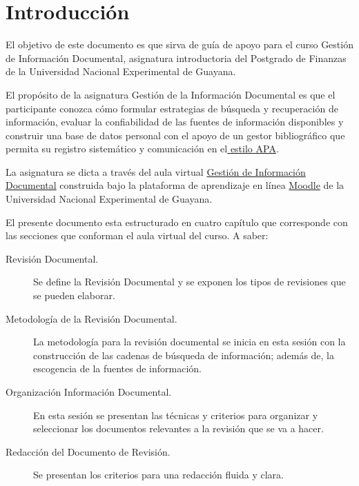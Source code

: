 \setchapterpreamble[u]{\margintoc}

\chapter*{Introducci\'on}
 


El objetivo de este  documento es que sirva de gu\'ia de apoyo para el  curso Gestión de Información Documental, asignatura introductoria  del Postgrado de Finanzas de la Universidad Nacional Experimental de Guayana. 

El propósito de la asignatura Gesti\'on de la Informaci\'on Documental es que el participante conozca cómo  formular estrategias de búsqueda y recuperación de información, evaluar la confiabilidad de las fuentes de información disponibles y construir una base de datos personal con el apoyo de un gestor bibliográfico que permita su registro sistemático y comunicación en el\href{https://normasapa.com/normas-apa-2019-cuestiones-mas-frecuentes/comment-page-11/}{ estilo APA}. 

La asignatura se dicta a trav\'es  del aula virtual \href{http://moodle.uneg.edu.ve/moodle/}{Gesti\'on de Informaci\'on Documental} construida bajo la plataforma de aprendizaje en l\'inea  \href{https://moodle.org/?lang=es}{Moodle} de la Universidad Nacional Experimental de Guayana.



El presente documento esta estructurado en cuatro cap\'itulo que corresponde con las secciones que conforman el aula virtual del curso. A saber:
\begin{description}
	\item [Revisi\'on Documental.] Se define la Revisi\'on Documental y se exponen los tipos de revisiones que se pueden elaborar.

	\item [Metodolog\'ia de la Revisi\'on Documental.] La metodolog\'ia para la revisi\'on documental se inicia en esta sesi\'on con la construcci\'on de las cadenas de b\'usqueda de informaci\'on; adem\'as de, la escogencia de la fuentes de informaci\'on.

	\item [Organizaci\'on Informaci\'on Documental.] En esta sesi\'on se presentan las t\'ecnicas y criterios para organizar y seleccionar los documentos relevantes a la revisi\'on que se va a hacer.

	\item [Redacci\'on del Documento de Revisi\'on.] Se presentan los criterios para una redacci\'on fluida y clara.
	
\end{description}


